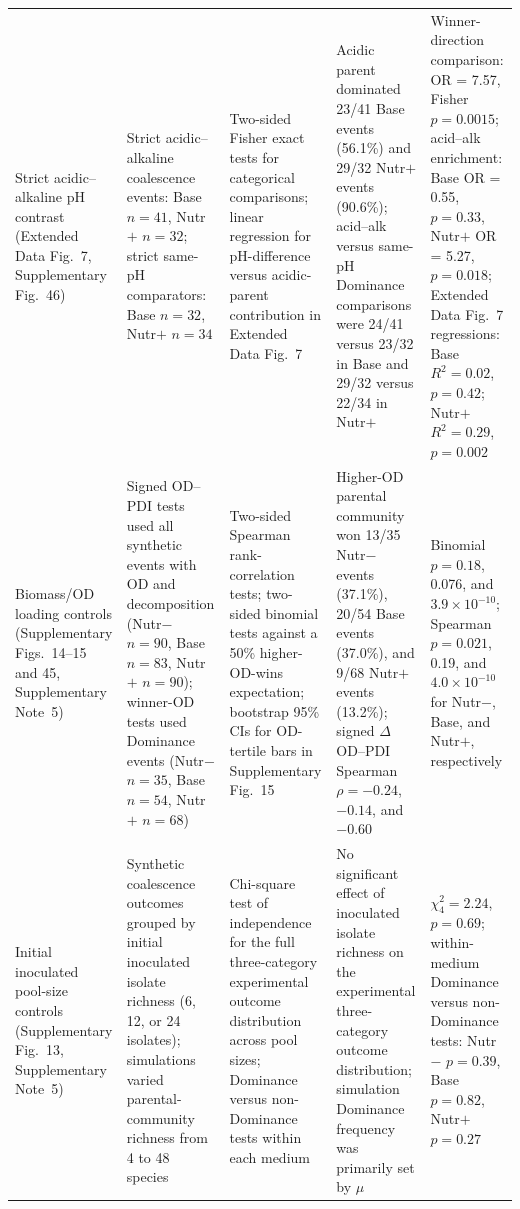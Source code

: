 \begin{longtable}{L{0.16\textwidth}L{0.18\textwidth}L{0.18\textwidth}L{0.22\textwidth}L{0.18\textwidth}}
Strict acidic--alkaline pH contrast (Extended Data Fig.~7, Supplementary Fig.~46) &
Strict acidic--alkaline coalescence events: Base $n=41$, Nutr$+$ $n=32$; strict same-pH comparators: Base $n=32$, Nutr$+$ $n=34$ &
Two-sided Fisher exact tests for categorical comparisons; linear regression for pH-difference versus acidic-parent contribution in Extended Data Fig.~7 &
Acidic parent dominated 23/41 Base events (56.1\%) and 29/32 Nutr$+$ events (90.6\%); acid--alk versus same-pH Dominance comparisons were 24/41 versus 23/32 in Base and 29/32 versus 22/34 in Nutr$+$ &
Winner-direction comparison: OR = 7.57, Fisher $p = 0.0015$; acid--alk enrichment: Base OR = 0.55, $p = 0.33$, Nutr$+$ OR = 5.27, $p = 0.018$; Extended Data Fig.~7 regressions: Base $R^2 = 0.02$, $p = 0.42$; Nutr$+$ $R^2 = 0.29$, $p = 0.002$ \\

Biomass/OD loading controls (Supplementary Figs.~14--15 and 45, Supplementary Note~5) &
Signed OD--PDI tests used all synthetic events with OD and decomposition (Nutr$-$ $n=90$, Base $n=83$, Nutr$+$ $n=90$); winner-OD tests used Dominance events (Nutr$-$ $n=35$, Base $n=54$, Nutr$+$ $n=68$) &
Two-sided Spearman rank-correlation tests; two-sided binomial tests against a 50\% higher-OD-wins expectation; bootstrap 95\% CIs for OD-tertile bars in Supplementary Fig.~15 &
Higher-OD parental community won 13/35 Nutr$-$ events (37.1\%), 20/54 Base events (37.0\%), and 9/68 Nutr$+$ events (13.2\%); signed $\Delta$OD--PDI Spearman $\rho = -0.24$, $-0.14$, and $-0.60$ &
Binomial $p = 0.18$, 0.076, and $3.9 \times 10^{-10}$; Spearman $p = 0.021$, 0.19, and $4.0 \times 10^{-10}$ for Nutr$-$, Base, and Nutr$+$, respectively \\

Initial inoculated pool-size controls (Supplementary Fig.~13, Supplementary Note~5) &
Synthetic coalescence outcomes grouped by initial inoculated isolate richness (6, 12, or 24 isolates); simulations varied parental-community richness from 4 to 48 species &
Chi-square test of independence for the full three-category experimental outcome distribution across pool sizes; Dominance versus non-Dominance tests within each medium &
No significant effect of inoculated isolate richness on the experimental three-category outcome distribution; simulation Dominance frequency was primarily set by $\mu$ &
$\chi^2_{4} = 2.24$, $p = 0.69$; within-medium Dominance versus non-Dominance tests: Nutr$-$ $p = 0.39$, Base $p = 0.82$, Nutr$+$ $p = 0.27$ \\


\end{longtable}
